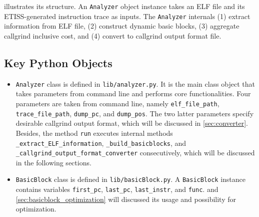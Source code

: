  illustrates its structure. An \texttt{Analyzer} object instance takes an ELF file and its ETISS-generated instruction trace as inputs. The \texttt{Analyzer} internals (1) extract information from ELF file, (2) construct dynamic basic blocks, (3) aggregate callgrind inclusive cost, and (4) convert to callgrind output format file. 

\medskip
{}
\medskip

\subsection{Key Python Objects}


\begin{itemize}
    \item \texttt{Analyzer} class is defined in \texttt{lib/analyzer.py}. It is the main class object that takes parameters from command line and performs core functionalities. Four parameters are taken from command line, namely \texttt{elf\_file\_path}, \texttt{trace\_file\_path}, \texttt{dump\_pc}, and \texttt{dump\_pos}. The two latter parameters specify desirable callgrind output format, which will be discussed in  \cref{sec:converter}. Besides, the method \texttt{run} executes internal methods \texttt{\_extract\_ELF\_information}, \texttt{\_build\_basicblocks}, and \texttt{\_callgrind\_output\_format\_converter} consecutively, which will be discussed in the following sections.

    \item \texttt{BasicBlock} class is defined in \texttt{lib/basicBlock.py}. A \texttt{BasicBlock} instance contains variables \texttt{first\_pc}, \texttt{last\_pc}, \texttt{last\_instr}, and \texttt{func}.  and  \cref{sec:basicblock_optimization} will discussed its usage and possibility for optimization.
\end{itemize}


